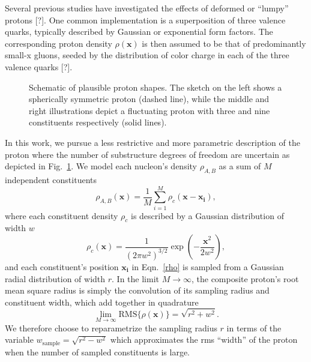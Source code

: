 \documentclass[aps,prc,reprint,amsmath,nofootinbib]{revtex4-1}
\newcommand{\w}{w_\mathrm{sample}}
\newcommand{\x}{\mathbf{x}}
\newcommand{\note}{\textcolor{theblue}{[?]}}
\begin{document}
Several previous studies have investigated the effects of deformed or ``lumpy'' protons \note.
One common implementation is a superposition of three valence quarks, typically described by Gaussian or exponential form factors.
The corresponding proton density $\rho(\mathbf{x})$ is then assumed to be that of predominantly small-x gluons, seeded by the distribution of color charge in each of the three valence quarks \note.

\begin{figure}
  \caption{\label{fig:substructure} Schematic of plausible proton shapes.
  The sketch on the left shows a spherically symmetric proton (dashed line), while the middle and right illustrations depict a fluctuating proton with three and nine constituents respectively (solid lines).
  }
\end{figure}

In this work, we pursue a less restrictive and more parametric description of the proton where the number of substructure degrees of freedom are uncertain as depicted in Fig.~\ref{fig:substructure}.
We model each nucleon's density $\rho_{A,B}$ as a sum of $M$ independent constituents
\begin{equation}
  \label{rho}
  \rho_{A, B}(\x) = \frac{1}{M} \sum\limits_{i=1}^M \rho_c(\mathbf{x} - \mathbf{x_i}),
\end{equation}
where each constituent density $\rho_c$ is described by a Gaussian distribution of width $w$
\begin{equation}
  \rho_c(\mathbf{x}) = \frac{1}{(2\pi w^2)^{3/2}} \exp\left(-\frac{\x^2}{2 w^2}\right),
\end{equation}
and each constituent's position $\mathbf{x_i}$ in Eqn.~\eqref{rho} is sampled from a Gaussian radial distribution of width $r$.
In the limit $M\to \infty$, the composite proton's root mean square radius is simply the convolution of its sampling radius and constituent width, which add together in quadrature
\begin{equation}
  \lim_{M\to\infty} \mathrm{RMS}\{\rho(\mathbf{x})\} = \sqrt{r^2 + w^2}.
\end{equation}
We therefore choose to reparametrize the sampling radius $r$ in terms of the variable $\w = \sqrt{r^2 - w^2}$ which approximates the rms ``width'' of the proton when the number of sampled constituents is large.
\end{document}
